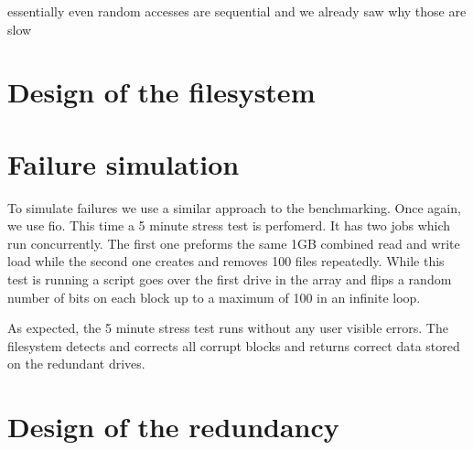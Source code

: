         essentially even random accesses are sequential and we already saw why those are slow

    \section{Design of the filesystem}

    \section{Failure simulation}

        To simulate failures we use a similar approach to the benchmarking.
        Once again, we use fio. This time a 5 minute stress test is perfomerd.
        It has two jobs which run concurrently. The first one preforms the same
        1GB combined read and write load while the second one creates and
        removes 100 files repeatedly. While this test is running a script goes
        over the first drive in the array and flips a random number of bits on
        each block up to a maximum of 100 in an infinite loop.

        As expected, the 5 minute stress test runs without any user visible
        errors. The filesystem detects and corrects all corrupt blocks and
        returns correct data stored on the redundant drives.


    \section{Design of the redundancy}


